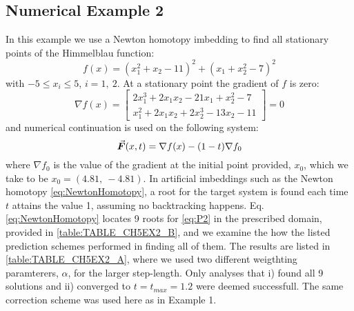 \subsection{Numerical Example 2}
In this example we use a Newton homotopy imbedding to find all stationary points
of the Himmelblau function:
\begin{equation}
	f(x)=(x_1^2+x_2-11)^2+(x_1+x_2^2-7)^2
	\label{eq:HIMMEL}
\end{equation}
with $-5\leq x_i\leq 5$, $i=1,\ 2$. At a stationary point the gradient of $f$ is
zero:
\begin{equation}
	\nabla f(x) = \begin{bmatrix}
		2x_1^3+2x_1x_2-21x_1+x_2^2-7\\
		x_1^2+2x_1x_2+2x_2^3-13x_2-11
	\end{bmatrix}=0
	\label{eq:P2}
\end{equation}
and numerical continuation is used on the following system:
\begin{equation}
	\vec{\bm{F}}(x,t) = \nabla f(x)-(1-t)\nabla f_0
	\label{eq:NewtonHomotopy}
\end{equation}
where $\nabla f_0$ is the value of the gradient at the initial point provided,
$x_0$, which we take to be $x_0=(4.81,\ -4.81)$. In artificial imbeddings such
as the Newton homotopy \ref{eq:NewtonHomotopy}, a root for the target system is 
found each time
$t$ attains the value 1, assuming no backtracking happens. Eq. 
\ref{eq:NewtonHomotopy}
locates 9 roots for \ref{eq:P2} in the
prescribed domain, provided in \ref{table:TABLE_CH5EX2_B}, and we examine the 
how the listed prediction schemes performed in finding all of them.  
The results are listed in \ref{table:TABLE_CH5EX2_A}, where we used
two different weigthting paramterers, $\alpha$, for the larger step-length. Only
analyses that i) found all 9 solutions and ii) converged to
$t=t_{max}=1.2$ were deemed successfull. 
The same correction scheme was used here as in Example 1.

